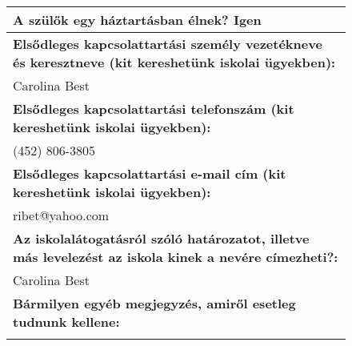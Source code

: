 \documentclass[10pt,a4paper]{article}
\begin{document}
\begin{figure}[!ht]
\begin{tabular}{|m{\textwidth}|}
\hline\vspace{3pt}
\textbf{A szülők egy háztartásban élnek? } \hspace{0.5cm} Igen \vspace{3pt} \\
\hline\vspace{3pt}
\textbf{Elsődleges kapcsolattartási személy vezetékneve és keresztneve (kit kereshetünk iskolai ügyekben):} \\ \hspace{0.5cm} Carolina Best \vspace{3pt} \\
\hline\vspace{3pt}
\textbf{Elsődleges kapcsolattartási telefonszám (kit kereshetünk iskolai ügyekben):} \\ \hspace{0.5cm} (452) 806-3805 \vspace{3pt} \\
\hline\vspace{3pt}
\textbf{Elsődleges kapcsolattartási e-mail cím (kit kereshetünk iskolai ügyekben):} \\ \hspace{0.5cm} ribet@yahoo.com \vspace{3pt} \\
\hline\vspace{3pt}
\textbf{Az iskolalátogatásról szóló határozatot, illetve más levelezést az iskola kinek a nevére címezheti?:} \\ \hspace{0.5cm} Carolina Best \vspace{3pt} \\
\hline\vspace{3pt}
\textbf{Bármilyen egyéb megjegyzés, amiről esetleg tudnunk kellene:} \\ \hspace{0.5cm}  \vspace{3pt} \\


\end{tabular}
\end{figure}
\end{document}
